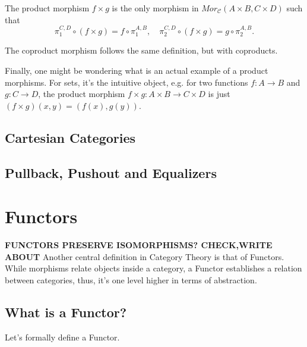 \begin{theorem}
  The product morphism $f\times g$ is the only morphism in $Mor_\mathcal C (A\times B, C \times D)$
  such that
  \begin{displaymath}
    \pi_1^{C,D} \circ (f\times g) = f \circ \pi_1^{A,B}, \quad
    \pi_2^{C,D} \circ (f\times g) = g \circ \pi_2^{A,B}.
  \end{displaymath}
\end{theorem}

The coproduct morphism follows the same definition, but with coproducts.

Finally, one might be wondering what is an actual example of a product morphisms.
For sets, it's the intuitive object, e.g. for two functions $f:A \to B$
and $g:C \to D$, the product morphism $f\times g:A\times B \to C \times D$
is just $(f\times g) (x,y) = (f(x), g(y))$.

\subsection{Cartesian Categories}

\subsection{Pullback, Pushout and Equalizers}

\section{Functors}

\textbf{FUNCTORS PRESERVE ISOMORPHISMS? CHECK,WRITE ABOUT}
Another central definition in Category Theory is that of Functors.
While morphisms relate objects inside a category, a Functor
establishes a relation between categories, thus, it's one level
higher in terms of abstraction.


\subsection{What is a Functor?}

Let's formally define a Functor.

